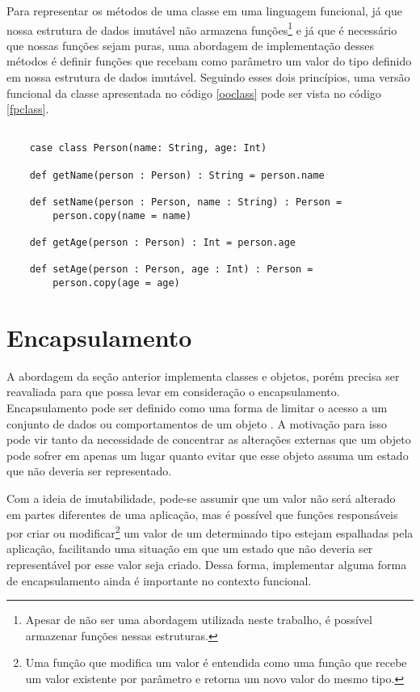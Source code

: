 Para representar os métodos de uma classe em uma 
linguagem funcional, já que nossa estrutura de dados 
imutável não armazena funções\footnote{Apesar de não 
ser uma abordagem utilizada neste trabalho, é 
possível armazenar funções nessas estruturas.} e já 
que é necessário que nossas funções sejam puras, 
uma abordagem de implementação desses 
métodos é definir funções que recebam 
como parâmetro um valor do tipo definido em nossa 
estrutura de dados imutável. Seguindo esses dois 
princípios, uma versão funcional da classe apresentada 
no código \ref{ooclass} pode ser vista no código \ref{fpclass}.


\begin{lstlisting}[caption={Representação de uma classe no contexto funcional},label=fpclass]
    
    case class Person(name: String, age: Int)

    def getName(person : Person) : String = person.name

    def setName(person : Person, name : String) : Person = 
        person.copy(name = name)

    def getAge(person : Person) : Int = person.age

    def setAge(person : Person, age : Int) : Person =
        person.copy(age = age)

\end{lstlisting}

\section{Encapsulamento}

A abordagem da seção anterior implementa 
classes e objetos, porém precisa ser 
reavaliada para que possa levar em consideração 
o encapsulamento. Encapsulamento pode ser definido 
como uma forma de limitar o acesso a um conjunto 
de dados ou comportamentos de um objeto \cite{quarkoo}. 
A motivação para isso pode vir tanto da necessidade 
de concentrar as alterações externas que um objeto 
pode sofrer em apenas um lugar quanto evitar que 
esse objeto assuma um estado que não deveria ser 
representado. 

Com a ideia de imutabilidade, pode-se 
assumir que um valor não será alterado em partes 
diferentes de uma aplicação, mas é possível 
que funções responsáveis por criar ou modificar\footnote{
    Uma função que modifica um valor é entendida 
    como uma função que recebe um valor existente 
    por parâmetro e retorna um novo valor do mesmo 
    tipo.
} 
um valor de um determinado tipo estejam 
espalhadas pela aplicação, facilitando uma 
situação em que um estado que não deveria ser 
representável por esse valor seja criado. 
Dessa forma, implementar alguma forma de 
encapsulamento ainda é importante no 
contexto funcional.

